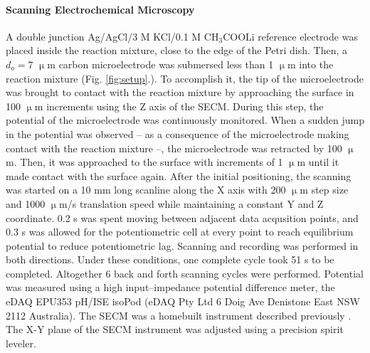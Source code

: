 \documentclass[3p]{elsarticle}
\begin{document}
\paragraph{Scanning Electrochemical Microscopy} A double junction Ag/AgCl/3 M KCl/0.1 M CH$_3$COOLi reference electrode was placed inside the reaction mixture, close to the edge of the Petri dish.
Then, a $d_o=7$ $\upmu$m carbon microelectrode was submersed less than 1 $\upmu$m into the reaction mixture (Fig. \ref{fig:setup}.).
To accomplish it, the tip of the microelectrode was brought to contact with the reaction mixture by approaching the surface in 100 $\upmu$m increments using the Z axis of the SECM.
During this step, the potential of the microelectrode was continuously monitored.
When a sudden jump in the potential was observed -- as a consequence of the microelectrode making contact with the reaction mixture --, the microelectrode was retracted by 100 $\upmu$m.
Then, it was approached to the surface with increments of 1 $\upmu$m until it made contact with the surface again.
After the initial positioning, the scanning was started on a 10 mm long scanline along the X axis with 200 $\upmu$m step size and 1000 $\upmu$m/s translation speed while maintaining a constant Y and Z coordinate.
0.2 s was spent moving between adjacent data acqusition points, and 0.3 s was allowed for the potentiometric cell at every point to reach equilibrium potential to reduce potentiometric lag.
Scanning and recording was performed in both directions.
Under these conditions, one complete cycle took 51 s to be completed.
Altogether 6 back and forth scanning cycles were performed.
Potential was measured using a high input--impedance potential difference meter, the eDAQ EPU353 pH/ISE isoPod (eDAQ Pty Ltd 6 Doig Ave Denistone East NSW 2112 Australia).
The SECM was a homebuilt instrument described previously \cite{andras2017recent}.
The X-Y plane of the SECM instrument was adjusted using a precision spirit leveler.
\end{document}
